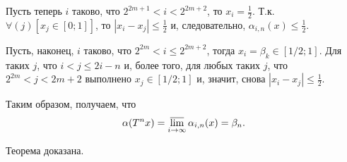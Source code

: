 Пусть теперь $i$ таково, что $2^{2m+1}<i<2^{2m+2}$,
то $x_i = \frac{1}{2}$.
Т.к.
$\forall(j)\left[x_j\in[0;1]\right]$,
то
$|x_i - x_j| \leq \frac{1}{2}$
и, следовательно,
$\alpha_{i,n}(x)  \leq \frac{1}{2}$.

Пусть, наконец, $i$ таково, что $2^{2m}<i \leq 2^{2m+2}$,
тогда
$x_i = \beta_k \in [1/2;1]$.
Для таких $j$, что $i<j\leq 2i-n$ и, более того,
для любых таких $j$, что $2^{2m}<j<{2m+2}$
выполнено $x_j\in[1/2; 1]$
и, значит, снова $|x_i - x_j| \leq \frac{1}{2}$.

Таким образом, получаем, что
\begin{equation}
	\alpha(T^n x) = \varlimsup_{i \to \infty} \alpha_{i,n}(x) = \beta_n
	.
\end{equation}

Теорема доказана.
